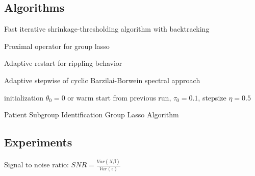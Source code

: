 \documentclass[12pt]{article}
\begin{document}
\subsection*{Algorithms}

Fast iterative shrinkage-thresholding algorithm with backtracking \cite{beck2009fast}

Proximal operator for group lasso \cite{liu2010fast}

Adaptive restart for rippling behavior \cite{o2015adaptive}

Adaptive stepwise of cyclic Barzilai-Borwein spectral approach \cite{wright2009sparse}




\begin{algorithm}[H]
  initialization $\theta_0=0$ or warm start from previous run, $\tau_0=0.1$, stepsize $\eta=0.5$\;
  \caption{Patient Subgroup Identification Group Lasso Algorithm}
 \end{algorithm}
 

\subsection*{Experiments}

Signal to noise ratio: $SNR=\frac{Var(X\beta)}{Var(\epsilon)}$




% 




\end{document}
